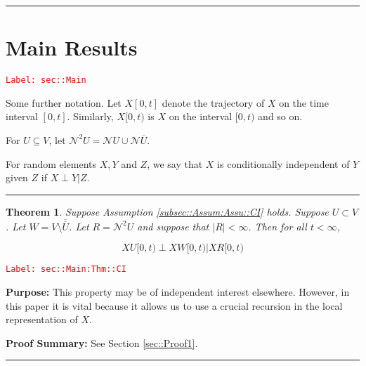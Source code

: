 \documentclass[12pt]{article}
\newcommand{\mc}{\mathcal}
\newcommand{\ov}{\overline}
\newcommand{\tr}{\textcolor{red}}
\newcommand{\labe}[1]{\tr{\texttt{Label: #1}}}
\newcommand{\purpose}{\textbf{Purpose: }}
\newcommand{\pfsum}{\textbf{Proof Summary: }}
\newcommand{\ind}{\hspace{24pt}}
\newcommand{\lin}{\rule{\linewidth}{0.4 pt}}
\renewcommand{\U}{U}							%
\newcommand{\UU}{W}								%
\newcommand{\UUU}{R}							%
\renewcommand{\t}{t}							%
\newcommand{\X}{X}								%
\newcommand{\neigh}{\mc{N}}						%
\newcommand{\dneigh}{\mc{N}^2}					%
\newcommand{\XX}{Y}								%
\newcommand{\XXX}{Z}							%
\newtheorem{thms}{Theorem}[section]
\begin{document}
\lin
\section{Main Results}
\label{sec::Main}\labe{sec::Main}

Some further notation. Let \(\X{}{[0,\t]}\) denote the trajectory of \(\X{}{}\) on the time interval \([0,\t]\). Similarly, \(\X{}{[0,\t)}\) is \(\X{}{}\) on the interval \([0,\t)\) and so on.

\ind For \(\U \subseteq  V\), let \(\dneigh{\U} = \neigh{\U} \cup \neigh{\ov{\U}}\). 

\ind For random elements \(\X{}{},\XX{}{}\) and \(\XXX{}{}\), we say that \(\X{}{}\) is conditionally independent of \(\XX{}{}\) given \(\XXX{}{}\) if \(\X{}{}\perp\XX{}{}|\XXX{}{}\).

\lin

\begin{thms}
Suppose Assumption \ref{subsec::Assum:Assu::CI} holds. Suppose \(\U \subset  V\). Let \(\UU =  V\setminus \ov{\ov{\U}}\). Let \(\UUU= \dneigh{U}\) and suppose that \(|\UUU| < \infty\). Then for all \(\t < \infty\),

\[\X{\U}{[0,\t)}\perp \X{\UU}{[0,\t)}|\X{\UUU}{[0,\t)}\]
\label{sec::Main:Thm::CI}
\end{thms}
\labe{sec::Main:Thm::CI}

\purpose This property may be of independent interest elsewhere. However, in this paper it is vital because it allows us to use a crucial recursion in the local representation of \(\X{}{}\).

\pfsum See Section \ref{sec::Proof1}.

\lin
\end{document}

